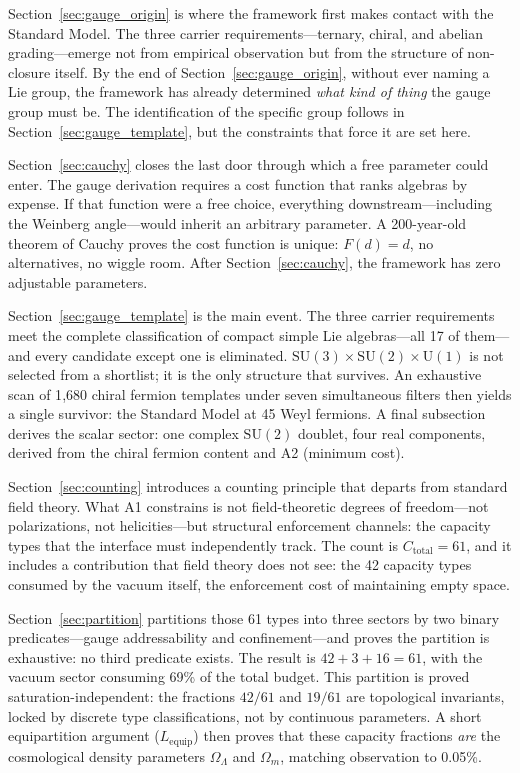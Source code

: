 \documentclass[11pt]{article}
\newcommand{\SU}{\mathrm{SU}}
\newcommand{\U}{\mathrm{U}}
\begin{document}
Section~\ref{sec:gauge_origin} is where the framework first makes contact with the Standard Model.  The three carrier requirements---ternary, chiral, and abelian grading---emerge not from empirical observation but from the structure of non-closure itself.  By the end of Section~\ref{sec:gauge_origin}, without ever naming a Lie group, the framework has already determined \emph{what kind of thing} the gauge group must be.  The identification of the specific group follows in Section~\ref{sec:gauge_template}, but the constraints that force it are set here.

Section~\ref{sec:cauchy} closes the last door through which a free parameter could enter.  The gauge derivation requires a cost function that ranks algebras by expense.  If that function were a free choice, everything downstream---including the Weinberg angle---would inherit an arbitrary parameter.  A 200-year-old theorem of Cauchy proves the cost function is unique: $F(d) = d$, no alternatives, no wiggle room.  After Section~\ref{sec:cauchy}, the framework has zero adjustable parameters.

Section~\ref{sec:gauge_template} is the main event.  The three carrier requirements meet the complete classification of compact simple Lie algebras---all 17 of them---and every candidate except one is eliminated.  $\SU(3) \times \SU(2) \times \U(1)$ is not selected from a shortlist; it is the only structure that survives.  An exhaustive scan of 1{,}680 chiral fermion templates under seven simultaneous filters then yields a single survivor: the Standard Model at 45 Weyl fermions.  A final subsection derives the scalar sector: one complex $\SU(2)$ doublet, four real components, derived from the chiral fermion content and A2 (minimum cost).

Section~\ref{sec:counting} introduces a counting principle that departs from standard field theory.  What A1 constrains is not field-theoretic degrees of freedom---not polarizations, not helicities---but structural enforcement channels: the capacity types that the interface must independently track.  The count is $C_{\mathrm{total}} = 61$, and it includes a contribution that field theory does not see: the 42 capacity types consumed by the vacuum itself, the enforcement cost of maintaining empty space.

Section~\ref{sec:partition} partitions those 61 types into three sectors by two binary predicates---gauge addressability and confinement---and proves the partition is exhaustive: no third predicate exists.  The result is $42 + 3 + 16 = 61$, with the vacuum sector consuming 69\% of the total budget.  This partition is proved saturation-independent: the fractions $42/61$ and $19/61$ are topological invariants, locked by discrete type classifications, not by continuous parameters.  A short equipartition argument ($L_{\mathrm{equip}}$) then proves that these capacity fractions \emph{are} the cosmological density parameters $\Omega_\Lambda$ and $\Omega_m$, matching observation to 0.05\%.
\end{document}
